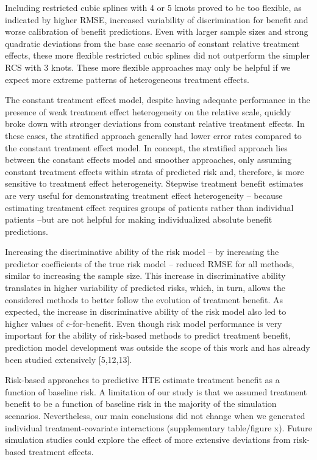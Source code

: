 \documentclass{article}
\begin{document}
Including restricted cubic splines with 4 or 5 knots proved to be too
flexible, as indicated by higher RMSE, increased variability of
discrimination for benefit and worse calibration of benefit predictions.
Even with larger sample sizes and strong quadratic deviations from the
base case scenario of constant relative treatment effects, these more
flexible restricted cubic splines did not outperform the simpler RCS
with 3 knots. These more flexible approaches may only be helpful if we
expect more extreme patterns of heterogeneous treatment effects.

The constant treatment effect model, despite having adequate performance
in the presence of weak treatment effect heterogeneity on the relative
scale, quickly broke down with stronger deviations from constant
relative treatment effects. In these cases, the stratified approach
generally had lower error rates compared to the constant treatment
effect model. In concept, the stratified approach lies between the
constant effects model and smoother approaches, only assuming constant
treatment effects within strata of predicted risk and, therefore, is
more sensitive to treatment effect heterogeneity. Stepwise treatment
benefit estimates are very useful for demonstrating treatment effect
heterogeneity -- because estimating treatment effect requires groups of
patients rather than individual patients --but are not helpful for
making individualized absolute benefit predictions.

Increasing the discriminative ability of the risk model -- by increasing
the predictor coefficients of the true risk model -- reduced RMSE for
all methods, similar to increasing the sample size. This increase in
discriminative ability translates in higher variability of predicted
risks, which, in turn, allows the considered methods to better follow
the evolution of treatment benefit. As expected, the increase in
discriminative ability of the risk model also led to higher values of
c-for-benefit. Even though risk model performance is very important for
the ability of risk-based methods to predict treatment benefit,
prediction model development was outside the scope of this work and has
already been studied extensively {[}5,12,13{]}.

Risk-based approaches to predictive HTE estimate treatment benefit as a
function of baseline risk. A limitation of our study is that we assumed
treatment benefit to be a function of baseline risk in the majority of
the simulation scenarios. Nevertheless, our main conclusions did not
change when we generated individual treatment-covariate interactions
(supplementary table/figure x). Future simulation studies could explore
the effect of more extensive deviations from risk-based treatment
effects.
\end{document}
